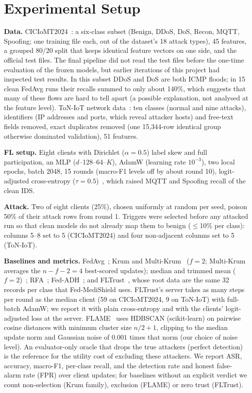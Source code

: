 \documentclass[conference]{IEEEtran}
\begin{document}
\section{Experimental Setup}
\label{sec:setup}
\textbf{Data.} CICIoMT2024~\cite{dadkhah2024ciciomt}: a six-class subset (Benign, DDoS, DoS, Recon, MQTT, Spoofing; one training file each, out of the dataset's 18 attack types), 45 features, a grouped 80/20 split that keeps identical feature vectors on one side, and the official test files. The final pipeline did not read the test files before the one-time evaluation of the frozen models, but earlier iterations of this project had inspected test results. In this subset DDoS and DoS are both ICMP floods; in 15 clean FedAvg runs their recalls summed to only about 140\%, which suggests that many of these flows are hard to tell apart (a possible explanation, not analysed at the feature level). ToN-IoT network data~\cite{moustafa2021ton}: ten classes (normal and nine attacks), identifiers (IP addresses and ports, which reveal attacker hosts) and free-text fields removed, exact duplicates removed (one 15,344-row identical group otherwise dominated validation), 51 features.

\textbf{FL setup.} Eight clients with Dirichlet ($\alpha=0.5$) label skew and full participation, an MLP ($d$--128--64--$K$), AdamW (learning rate $10^{-3}$), two local epochs, batch 2048, 15 rounds (macro-F1 levels off by about round 10), logit-adjusted cross-entropy ($\tau=0.5$)~\cite{menon2021logit}, which raised MQTT and Spoofing recall of the clean IDS.

\textbf{Attack.} Two of eight clients (25\%), chosen uniformly at random per seed, poison 50\% of their attack rows from round 1. Triggers were selected before any attacked run so that clean models do not already map them to benign ($\leq$10\% per class): columns 5--8 set to 5 (CICIoMT2024) and four non-adjacent columns set to 5 (ToN-IoT).

\textbf{Baselines and metrics.} FedAvg~\cite{mcmahan2017fedavg}; Krum and Multi-Krum~\cite{blanchard2017krum} ($f=2$; Multi-Krum averages the $n-f-2=4$ best-scored updates); median and trimmed mean ($f=2$)~\cite{yin2018median}; RFA~\cite{pillutla2022rfa}; Fed-ADH~\cite{pathak2026early}; and FLTrust~\cite{cao2021fltrust}, whose root data are the same 32 records per class that Fed-MediShield uses. FLTrust's server takes as many steps per round as the median client (59 on CICIoMT2024, 9 on ToN-IoT) with full-batch AdamW; we report it with plain cross-entropy and with the clients' logit-adjusted loss at the server. FLAME~\cite{nguyen2022flame} uses HDBSCAN (scikit-learn) on pairwise cosine distances with minimum cluster size $n/2+1$, clipping to the median update norm and Gaussian noise of $0.001$ times that norm (our choice of noise level). An evaluator-only oracle that drops the true attackers (perfect detection) is the reference for the utility cost of excluding these attackers. We report ASR, accuracy, macro-F1, per-class recall, and the detection rate and honest false-alarm rate (FPR) over client updates; for baselines without an explicit verdict we count non-selection (Krum family), exclusion (FLAME) or zero trust (FLTrust).
\end{document}
